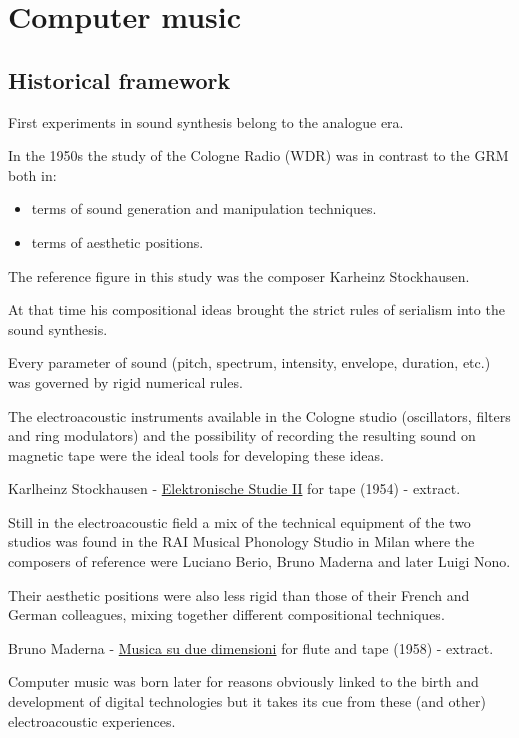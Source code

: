 \chapter{Computer music}

\section{Historical framework}\label{historical-framework}

First experiments in sound synthesis belong to the analogue era.

In the 1950s the study of the Cologne Radio (WDR) was in contrast to the GRM both in:

\begin{itemize}
\tightlist
\item terms of sound generation and manipulation techniques. 
\item terms of aesthetic positions.
\end{itemize}

The reference figure in this study was the composer Karheinz Stockhausen.

At that time his compositional ideas brought the strict rules of serialism into the sound synthesis.

Every parameter of sound (pitch, spectrum, intensity, envelope, duration, etc.) was governed by rigid numerical rules.

The electroacoustic instruments available in the Cologne studio (oscillators, filters and ring modulators) and the possibility of recording the resulting sound on magnetic tape were the ideal tools for developing these ideas.

Karlheinz Stockhausen - \href{http://www.musicaecodice.it/gitmedia/emc/4_media/studio2.mp3}{Elektronische Studie II} for tape (1954) - extract.

Still in the electroacoustic field a mix of the technical equipment of the two studios was found in the RAI Musical Phonology Studio in Milan where the composers of reference were Luciano Berio, Bruno Maderna and later Luigi Nono.

Their aesthetic positions were also less rigid than those of their French and German colleagues, mixing together different compositional techniques.

Bruno Maderna - \href{http://www.musicaecodice.it/gitmedia/emc/4_media/maderna.mp3}{Musica su due dimensioni} for flute and tape (1958) - extract.

Computer music was born later for reasons obviously linked to the birth and development of digital technologies but it takes its cue from these (and other) electroacoustic experiences.

